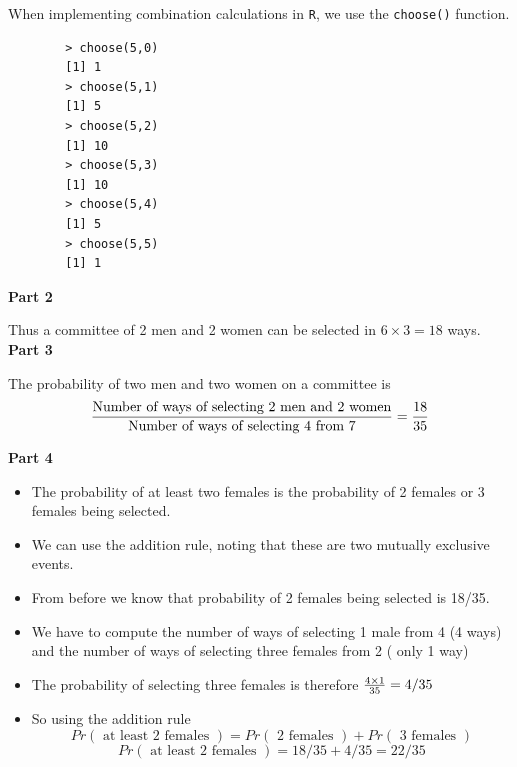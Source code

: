\documentclass[12pt]{report}
\begin{document}
		When implementing combination calculations in \texttt{R}, we use the \texttt{choose()} function.
		
		\begin{verbatim}
		> choose(5,0)
		[1] 1
		> choose(5,1)
		[1] 5
		> choose(5,2)
		[1] 10
		> choose(5,3)
		[1] 10
		> choose(5,4)
		[1] 5
		> choose(5,5)
		[1] 1
		\end{verbatim}
		
		{\Large
			
			\textbf{Part 2}
			
			Thus a committee of 2 men and 2 women can be selected in $ 6 \times 3  = 18 $ ways.\\
			\bigskip
			\textbf{Part 3}
			
			The probability of two men and two women on a committee is
			\[ {\mbox{Number of ways of selecting 2 men and 2 women} \over \mbox{Number of ways of selecting 4 from 7}} = {18 \over 35 }\]
			
		}
		{\Large
			
			\textbf{Part 4}
			\begin{itemize}
				\item The probability of at least two females is the probability of 2 females or 3 females being selected.
				\item We can use the addition rule, noting that these are two mutually exclusive events.
				\item From before we know that probability of 2 females being selected is 18/35.
			\end{itemize}
			
		}
		{\Large

			\begin{itemize}
				\item We have to compute the number of ways of selecting 1 male from 4 (4 ways) and the number of ways of selecting three females from 2 ( only 1 way)
				\item The probability of selecting three females is therefore ${4 \times 1 \over 35} = 4/35$
				\item So using the addition rule
				\[ Pr(\mbox{ at least 2 females }) = Pr(\mbox{ 2 females }) + Pr(\mbox{ 3 females }) \]
				\[ Pr(\mbox{ at least 2 females })  = 18/35 + 4/35 = 22/35 \]
			\end{itemize}
			
		}
\newpage		
\end{document}
